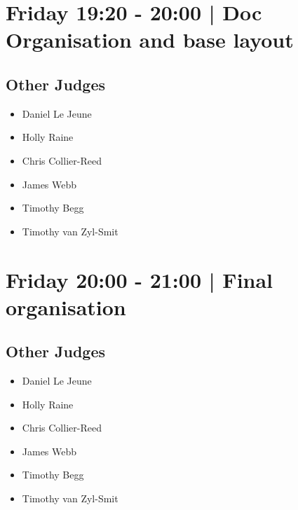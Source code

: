 \documentclass[10pt, A5]{article}
\begin{document}
            \section*{Friday 19:20
        -
        20:00
        |
         Doc Organisation and base layout}
        
                
        \subsection*{Other Judges}
        
            \begin{itemize}
                            \item Daniel Le Jeune
                            \item Holly Raine
                            \item Chris Collier-Reed
                            \item James Webb
                            \item Timothy Begg
                            \item Timothy van Zyl-Smit
                        \end{itemize}
        

            \section*{Friday 20:00
        -
        21:00
        |
         Final organisation}
        
                
        \subsection*{Other Judges}
        
            \begin{itemize}
                            \item Daniel Le Jeune
                            \item Holly Raine
                            \item Chris Collier-Reed
                            \item James Webb
                            \item Timothy Begg
                            \item Timothy van Zyl-Smit
                        \end{itemize}
        
\end{document}
